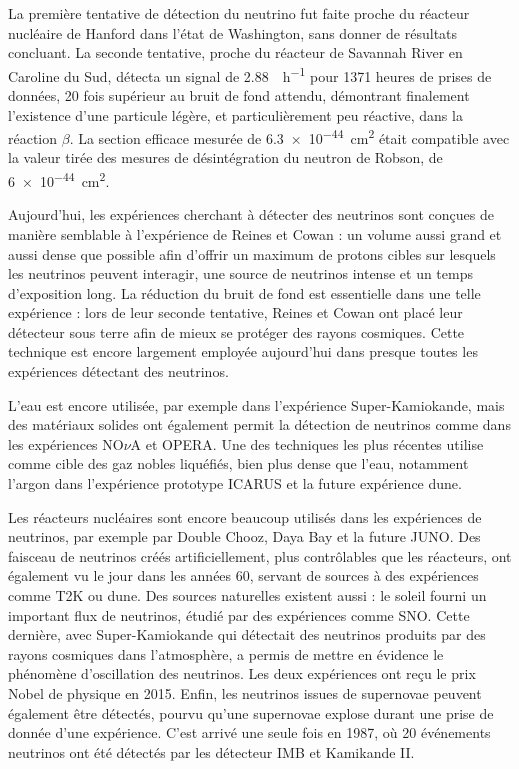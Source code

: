 		    La première tentative de détection du neutrino fut faite proche du réacteur nucléaire de Hanford dans l'état de Washington, sans donner de résultats concluant. La seconde tentative, proche du réacteur de Savannah River en Caroline du Sud, détecta un signal de \SI{2.88}{\per\hour}\cite{Cowan1956} pour 1371 heures de prises de données, 20 fois supérieur au bruit de fond attendu, démontrant finalement l'existence d'une particule légère, et particulièrement peu réactive, dans la réaction $\beta$. La section efficace mesurée de  \SI{6.3e-44}{\centi\meter\squared} était compatible avec la valeur tirée des mesures de désintégration du neutron de Robson\cite{Robson1951}, de \SI{6e-44}{\centi\meter\squared}.
		    
		    Aujourd'hui, les expériences cherchant à détecter des neutrinos sont conçues de manière semblable à l'expérience de Reines et Cowan : un volume aussi grand et aussi dense que possible afin d'offrir un maximum de protons cibles sur lesquels les neutrinos  peuvent interagir, une source de neutrinos intense et un temps d'exposition long. La réduction du bruit de fond est essentielle dans une telle expérience : lors de leur seconde tentative, Reines et Cowan ont placé leur détecteur sous terre afin de mieux se protéger des rayons cosmiques. Cette technique est encore largement employée aujourd'hui dans presque toutes les expériences détectant des neutrinos.
		    
		    L'eau est encore utilisée, par exemple dans l'expérience Super-Kamiokande\cite{Fukuda1998}, mais des matériaux solides ont également permit la détection de neutrinos comme dans les expériences NO$\nu$A\cite{Adamson2016} et OPERA\cite{Agafonova2018}. Une des techniques les plus récentes utilise comme cible des gaz nobles liquéfiés, bien plus dense que l'eau, notamment l'argon dans l'expérience prototype ICARUS\cite{Amerio2004} et la future expérience \gls{dune}\cite{Acciarri2016a}. 
		    
		    Les réacteurs nucléaires sont encore beaucoup utilisés dans les expériences de neutrinos, par exemple par Double Chooz\cite{Crespo-Anadon2014}, Daya Bay\cite{An2014} et la future JUNO\cite{An2015}. Des faisceau de neutrinos créés artificiellement, plus contrôlables que les réacteurs, ont également vu le jour dans les années 60, servant de sources à des expériences comme T2K\cite{Abe2018} ou \gls{dune}\cite{Strait2016}. Des sources naturelles existent aussi : le soleil fourni un important flux de neutrinos, étudié par des expériences comme SNO\cite{Aharmim2013}. Cette dernière, avec Super-Kamiokande\cite{Fukuda1998} qui détectait des neutrinos produits par des rayons cosmiques dans l'atmosphère, a permis de mettre en évidence le phénomène d'oscillation des neutrinos. Les deux expériences ont reçu le prix Nobel de physique en 2015. Enfin, les neutrinos issues de supernovae peuvent également être détectés, pourvu qu'une supernovae explose durant une prise de donnée d'une expérience. C'est arrivé une seule fois en 1987, où 20 événements neutrinos ont été détectés par les détecteur IMB et Kamikande II\cite{Hirata1987}.

